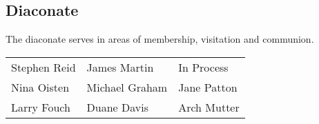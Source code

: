 \subsection{Diaconate}
\label{diaconate}

The diaconate serves in areas of membership, visitation and communion.

\begin{tabular}{@{}lll}
Stephen Reid & James Martin & In Process \\ %
Nina Oisten & Michael Graham & Jane Patton \\ %
Larry Fouch & Duane Davis & Arch Mutter \\ %
\end{tabular}
 

 \vfill 